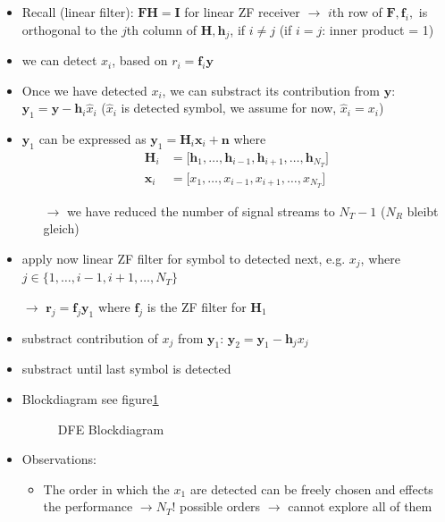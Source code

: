 \documentclass[a4paper, 10pt]{article}
\begin{document}
\begin{itemize}
	\item Recall (linear filter): $\mathbf{FH} = \mathbf{I} $ for linear ZF receiver $\rightarrow$ $i$th row of $\mathbf{F}, \mathbf{f}_i, $ is orthogonal to the $j$th column of $\mathbf{H}, \mathbf{h}_j$, if $ i \neq j$ (if $i = j$: inner product = 1)  
	\item we can detect $x_i$, based on $r_i = \mathbf{f}_i\mathbf{y} $
	\item Once we have detected $x_i$, we can substract its contribution from $\mathbf{y}$: $\mathbf{y}_1 = \mathbf{y} - \mathbf{h}_i\hat{x}_i$ ($\hat{x}_i $ is detected symbol, we assume for now, $\hat{x}_i = x_i $) 
	\item $\mathbf{y}_1 $ can be expressed as $ \mathbf{y}_1 = \mathbf{H}_i\mathbf{x}_i + \mathbf{n}$ where 
	\begin{align*}
		\mathbf{H}_i &= \bigl[\mathbf{h}_1, \dots ,\mathbf{h}_{i-1},\mathbf{h}_{i+1},\dots ,\mathbf{h}_{N_T} \bigr] \\
		\mathbf{x}_i &= \bigl[x_1, \dots , x_{i-1}, x_{i+1}, \dots ,x_{N_T}\bigr]
	\end{align*}
	\begin{itemize}
		\item[$\rightarrow$] we have reduced the number of signal streams to $N_T - 1$ ($N_R $ bleibt gleich)
	\end{itemize}
	\item apply now linear ZF filter for symbol to detected next, e.g. $x_j $, where $ j\in \bigl\{1, \dots ,i - 1, i + 1, \dots , N_T\bigr\} $
	\item[$\rightarrow$] $ \mathbf{r}_j = \mathbf{f}_j\mathbf{y}_1 $ where $\mathbf{f}_j $ is the ZF filter for $\mathbf{H}_1$ 
	\item substract contribution of $x_j $ from $\mathbf{y}_1 $: $\mathbf{y}_2 = \mathbf{y}_1 - \mathbf{h}_j x_j $
	\item substract until last symbol is detected
	\item Blockdiagram see figure\ref{DFE} 
	\begin{figure}[h]
		\centering
		\resizebox{\textwidth}{!}{}
		\caption{DFE Blockdiagram}
		\label{DFE}
	\end{figure}
	\item Observations:
	\begin{itemize}
		\item The order in which the $x_1 $ are detected can be freely chosen and effects the performance $\rightarrow  N_T! $ possible orders $\rightarrow$ cannot explore all of them

\end{itemize}
\end{itemize}
\end{document}
